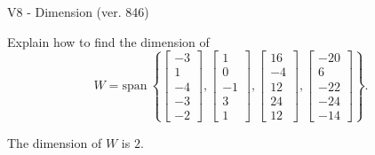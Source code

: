\begin{exercise}
  \begin{exerciseTitle}V8 - Dimension (ver. 846)\end{exerciseTitle}
  \begin{exerciseStatement}
    Explain how to find the dimension of 
\[W=\mathrm{span}\ \left\{\left[\begin{array}{r}
-3 \\
1 \\
-4 \\
-3 \\
-2
\end{array}\right] , \left[\begin{array}{r}
1 \\
0 \\
-1 \\
3 \\
1
\end{array}\right] , \left[\begin{array}{r}
16 \\
-4 \\
12 \\
24 \\
12
\end{array}\right] , \left[\begin{array}{r}
-20 \\
6 \\
-22 \\
-24 \\
-14
\end{array}\right]\right\}.\]



  \end{exerciseStatement}
  \begin{exerciseAnswer}
   The dimension of \(W\) is  \(2\).
  


  \end{exerciseAnswer}
\end{exercise}